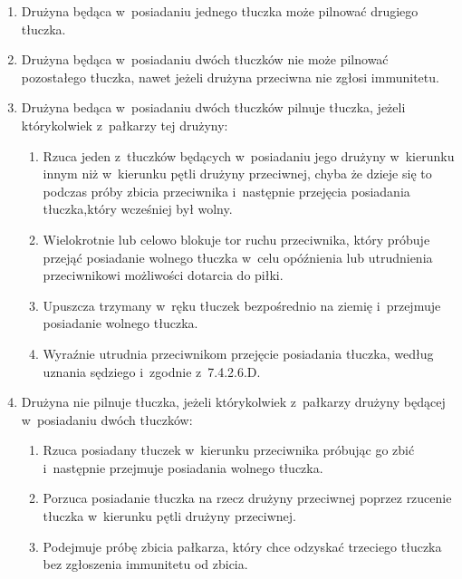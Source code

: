 \documentclass[12pt]{article}
\begin{document}
\begin{enumerate}
	\item
	      Drużyna będąca w~posiadaniu jednego tłuczka może pilnować drugiego
	      tłuczka.
	\item
	      Drużyna będąca w~posiadaniu dwóch tłuczków nie może pilnować
	      pozostałego tłuczka, nawet jeżeli drużyna przeciwna nie zgłosi
	      immunitetu.
	\item
	      Drużyna bedąca w~posiadaniu dwóch tłuczków pilnuje tłuczka, jeżeli
	      którykolwiek z~pałkarzy tej drużyny:

	      \begin{enumerate}
		      \item
		            Rzuca jeden z~tłuczków będących w~posiadaniu jego drużyny w~kierunku
		            innym niż w~kierunku pętli drużyny przeciwnej, chyba że dzieje się
		            to podczas próby zbicia przeciwnika i~następnie przejęcia posiadania
		            tłuczka,który wcześniej był wolny.
		      \item
		            Wielokrotnie lub celowo blokuje tor ruchu przeciwnika, który próbuje
		            przejąć posiadanie wolnego tłuczka w~celu opóźnienia lub utrudnienia
		            przeciwnikowi możliwości dotarcia do piłki.
		      \item
		            Upuszcza trzymany w~ręku tłuczek bezpośrednio na ziemię i~przejmuje
		            posiadanie wolnego tłuczka.
		      \item
		            Wyraźnie utrudnia przeciwnikom przejęcie posiadania tłuczka, według
		            uznania sędziego i~zgodnie z~7.4.2.6.D.
	      \end{enumerate}
	\item
	      Drużyna nie pilnuje tłuczka, jeżeli którykolwiek z~pałkarzy drużyny
	      będącej w~posiadaniu dwóch tłuczków:

	      \begin{enumerate}
		      \item
		            Rzuca posiadany tłuczek w~kierunku przeciwnika próbując go zbić i~następnie przejmuje posiadania wolnego tłuczka.
		      \item
		            Porzuca posiadanie tłuczka na rzecz drużyny przeciwnej poprzez
		            rzucenie tłuczka w~kierunku pętli drużyny przeciwnej.
		      \item
		            Podejmuje próbę zbicia pałkarza, który chce odzyskać trzeciego
		            tłuczka bez zgłoszenia immunitetu od zbicia.
	      \end{enumerate}
\end{enumerate}
\end{document}
